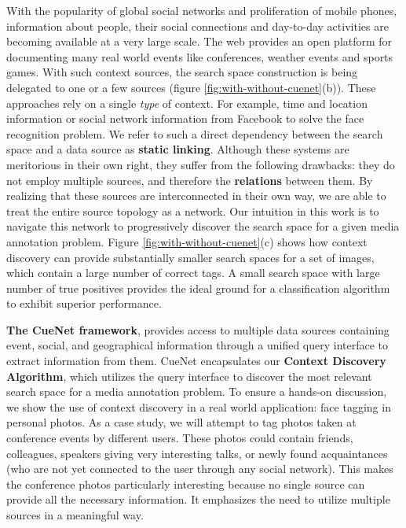With the popularity of global social networks and proliferation of mobile phones, information about people, their social connections and day-to-day activities are becoming available at a very large scale. The web provides an open platform for documenting many real world events like conferences, weather events and sports games. With such context sources, the search space construction is being delegated to one or a few sources \cite{henter2012tag, li2012fusing, naaman2005identity, o2009context,  stone2008autotagging} (figure \ref{fig:with-without-cuenet}(b)). These approaches rely on a single \textit{type} of context. For example, time and location information or social network information from Facebook to solve the face recognition problem. We refer to such a direct dependency between the search space and a data source as \textbf{static linking}. Although these systems are meritorious in their own right, they suffer from the following drawbacks: they do not employ multiple sources, and therefore the \textbf{relations} between them. By realizing that these sources are interconnected in their own way, we are able to treat the entire source topology as a network. Our intuition in this work is to navigate this network to progressively discover the search space for a given media annotation problem. Figure \ref{fig:with-without-cuenet}(c) shows how context discovery can provide substantially smaller search spaces for a set of images, which contain a large number of correct tags. A small search space with large number of true positives provides the ideal ground for a classification algorithm to exhibit superior performance.

\textbf{The CueNet framework}, provides access to multiple data sources containing event, social, and geographical information through a unified query interface to extract information from them. CueNet encapsulates our \textbf{Context Discovery Algorithm}, which utilizes the query interface to discover the most relevant search space for a media annotation problem. To ensure a hands-on discussion, we show the use of context discovery in a real world application: face tagging in personal photos. As a case study, we will attempt to tag photos taken at conference events by different users. These photos could contain friends, colleagues, speakers giving very interesting talks, or newly found acquaintances (who are not yet connected to the user through any social network). This makes the conference photos particularly interesting because no single source can provide all the necessary information. It emphasizes the need to utilize multiple sources in a meaningful way.

